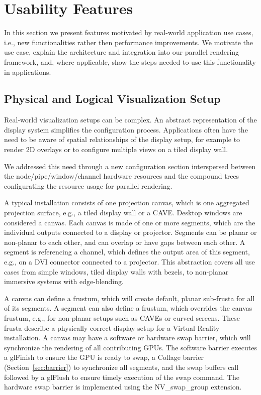 \documentclass[10pt,journal,compsoc]{IEEEtran}
\newcommand{\sref}[1]{Section~\ref{#1}}
\providecommand{\DIFaddbegin}{} %
\providecommand{\DIFaddend}{} %
\newcommand{\DIFaddincludegraphics}[2][]{{\color{blue}\fbox{\DIFOincludegraphics[#1]{#2}}}} %
\DeclareRobustCommand{\DIFaddbegin}{\DIFOaddbegin \let\includegraphics\DIFaddincludegraphics} %
\DeclareRobustCommand{\DIFaddend}{\DIFOaddend \let\includegraphics\DIFOincludegraphics} %
\begin{document}
\section{Usability Features}

In this section we present features motivated by real-world application use
cases, i.e., new functionalities rather then performance improvements. We
motivate the use case, explain the architecture and integration into our
parallel rendering framework, and, where applicable, show the steps needed to
use this functionality in applications.

\subsection{Physical and Logical Visualization Setup}\DIFaddbegin \label{sView}
\DIFaddend 

Real-world visualization setups can be complex. An abstract representation of
the display system simplifies the configuration process. Applications often have
the need to be aware of spatial relationships of the display setup, for example
to render 2D overlays or to configure multiple views on a tiled display wall.

We addressed this need through a new configuration section interspersed between
the node/pipe/window/channel hardware resources and the compound trees
configurating the resource usage for parallel rendering.

A typical installation consists of one projection canvas, which is one
aggregated projection surface, e.g., a tiled display wall or a CAVE. Desktop
windows are considered a canvas. Each canvas is made of one or more segments,
which are the individual outputs connected to a display or projector. Segments
can be planar or non-planar to each other, and can overlap or have gaps between
each other. A segment is referencing a channel, which defines the output area of
this segment, e.g., on a DVI connector connected to a projector. This
abstraction covers all use cases from simple windows, tiled display walls with
bezels, to non-planar immersive systems with edge-blending.

A canvas can define a frustum, which will create default, planar sub-frusta for
all of its segments. A segment can also define a frustum, which overrides the
canvas frustum, e.g., for non-planar setups such as CAVEs or curved screens.
These frusta describe a physically-correct display setup for a Virtual Reality
installation. \label{sec:swap} A canvas may have a software or hardware swap
barrier, which will synchronize the rendering of all contributing GPUs. The
software barrier executes a \textsf{glFinish} to ensure the GPU is ready to
swap, a \textsf{Collage} barrier (\sref{sec:barrier}) to synchronize all
segments, and the swap buffers call followed by a \textsf{glFlush} to ensure timely
execution of the swap command. The hardware swap barrier is implemented using
the \textsf{NV\_swap\_group} extension.
\end{document}
